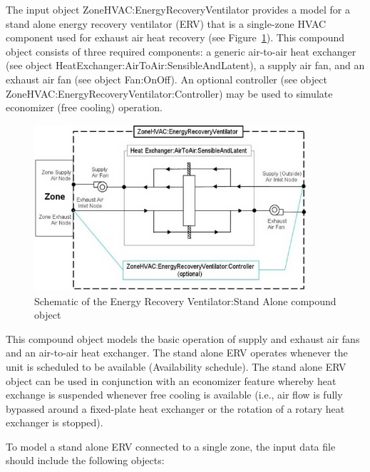 The input object ZoneHVAC:EnergyRecoveryVentilator provides a model for a stand alone energy recovery ventilator (ERV) that is a single-zone HVAC component used for exhaust air heat recovery (see Figure~\ref{fig:schematic-of-the-energy-recovery-ventilator}). This compound object consists of three required components: a generic air-to-air heat exchanger (see object HeatExchanger:AirToAir:SensibleAndLatent), a supply air fan, and an exhaust air fan (see object Fan:OnOff). An optional controller (see object~ ZoneHVAC:EnergyRecoveryVentilator:Controller) may be used to simulate economizer (free cooling) operation.

\begin{figure}[hbtp] %
\centering
\includegraphics[width=0.9\textwidth, height=0.9\textheight, keepaspectratio=true]{media/image7321.png}
\caption{Schematic of the Energy Recovery Ventilator:Stand Alone compound object \protect \label{fig:schematic-of-the-energy-recovery-ventilator}}
\end{figure}

This compound object models the basic operation of supply and exhaust air fans and an air-to-air heat exchanger. The stand alone ERV operates whenever the unit is scheduled to be available (Availability schedule). The stand alone ERV object can be used in conjunction with an economizer feature whereby heat exchange is suspended whenever free cooling is available (i.e., air flow is fully bypassed around a fixed-plate heat exchanger or the rotation of a rotary heat exchanger is stopped).

To model a stand alone ERV connected to a single zone, the input data file should include the following objects:

